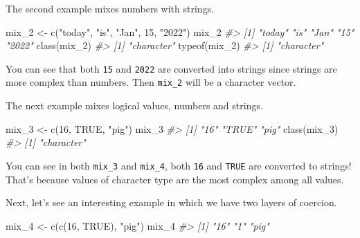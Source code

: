 \documentclass[
]{book}
\newenvironment{Shaded}{\begin{snugshade}}{\end{snugshade}}
\newcommand{\CommentTok}[1]{\textcolor[rgb]{0.56,0.35,0.01}{\textit{#1}}}
\newcommand{\ConstantTok}[1]{\textcolor[rgb]{0.00,0.00,0.00}{#1}}
\newcommand{\DecValTok}[1]{\textcolor[rgb]{0.00,0.00,0.81}{#1}}
\newcommand{\FunctionTok}[1]{\textcolor[rgb]{0.00,0.00,0.00}{#1}}
\newcommand{\NormalTok}[1]{#1}
\newcommand{\OtherTok}[1]{\textcolor[rgb]{0.56,0.35,0.01}{#1}}
\newcommand{\StringTok}[1]{\textcolor[rgb]{0.31,0.60,0.02}{#1}}
\begin{document}
The second example mixes numbers with strings.

\begin{Shaded}
\begin{Highlighting}[]
\NormalTok{mix\_2 }\OtherTok{\textless{}{-}} \FunctionTok{c}\NormalTok{(}\StringTok{"today"}\NormalTok{, }\StringTok{"is"}\NormalTok{, }\StringTok{"Jan"}\NormalTok{, }\DecValTok{15}\NormalTok{, }\StringTok{"2022"}\NormalTok{)}
\NormalTok{mix\_2 }
\CommentTok{\#\textgreater{} [1] "today" "is"    "Jan"   "15"    "2022"}
\FunctionTok{class}\NormalTok{(mix\_2)}
\CommentTok{\#\textgreater{} [1] "character"}
\FunctionTok{typeof}\NormalTok{(mix\_2)}
\CommentTok{\#\textgreater{} [1] "character"}
\end{Highlighting}
\end{Shaded}

You can see that both \texttt{15} and \texttt{2022} are converted into strings since strings are more complex than numbers. Then \texttt{mix\_2} will be a character vector.

The next example mixes logical values, numbers and strings.

\begin{Shaded}
\begin{Highlighting}[]
\NormalTok{mix\_3 }\OtherTok{\textless{}{-}} \FunctionTok{c}\NormalTok{(}\DecValTok{16}\NormalTok{, }\ConstantTok{TRUE}\NormalTok{, }\StringTok{"pig"}\NormalTok{)}
\NormalTok{mix\_3}
\CommentTok{\#\textgreater{} [1] "16"   "TRUE" "pig"}
\FunctionTok{class}\NormalTok{(mix\_3)}
\CommentTok{\#\textgreater{} [1] "character"}
\end{Highlighting}
\end{Shaded}

You can see in both \texttt{mix\_3} and \texttt{mix\_4}, both \texttt{16} and \texttt{TRUE} are converted to strings! That's because values of character type are the most complex among all values.

Next, let's see an interesting example in which we have two layers of coercion.

\begin{Shaded}
\begin{Highlighting}[]
\NormalTok{mix\_4 }\OtherTok{\textless{}{-}} \FunctionTok{c}\NormalTok{(}\FunctionTok{c}\NormalTok{(}\DecValTok{16}\NormalTok{, }\ConstantTok{TRUE}\NormalTok{), }\StringTok{"pig"}\NormalTok{)}
\NormalTok{mix\_4}
\CommentTok{\#\textgreater{} [1] "16"  "1"   "pig"}
\end{Highlighting}
\end{Shaded}
\end{document}
